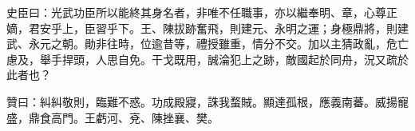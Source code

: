 \begin{pinyinscope}
 史臣曰：光武功臣所以能終其身名者，非唯不任職事，亦以繼奉明、章，心尊正嫡，君安乎上，臣習乎下。王、陳拔跡奮飛，則建元、永明之運；身極鼎將，則建武、永元之朝。勛非往時，位逾昔等，禮授雖重，情分不交。加以主猜政亂，危亡慮及，舉手捍頭，人思自免。干戈既用，誠淪犯上之跡，敵國起於同舟，況又疏於此者也？



 贊曰：糾糾敬則，臨難不惑。功成殿寢，誅我蝥賊。顯達孤根，應義南蕃。威揚寵盛，鼎食高門。王虧河、兗、陳挫襄、樊。



\end{pinyinscope}
